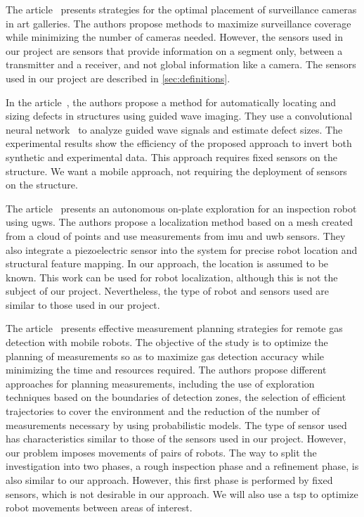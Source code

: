 The article~\cite{article455556} presents strategies for the optimal placement of surveillance cameras in art galleries.
The authors propose methods to maximize surveillance coverage while minimizing the number of cameras needed.
However, the sensors used in our project are sensors that provide information on a segment only, between a transmitter and a receiver, and not global information like a camera.
The sensors used in our project are described in \ref{sec:definitions}.

In the article~\cite{articlesvsdf}, the authors propose a method for automatically locating and sizing defects in structures using guided wave imaging.
They use a convolutional neural network~\cite{enwiki:1159408824} to analyze guided wave signals and estimate defect sizes.
The experimental results show the efficiency of the proposed approach to invert both synthetic and experimental data.
This approach requires fixed sensors on the structure.
We want a mobile approach, not requiring the deployment of sensors on the structure.

The article~\cite{9568841} presents an autonomous on-plate exploration for an inspection robot using \gls{ugw}s.
The authors propose a localization method based on a mesh created from a cloud of points and use measurements from \gls{imu} and \gls{uwb} sensors.
They also integrate a piezoelectric sensor into the system for precise robot location and structural feature mapping.
In our approach, the location is assumed to be known.
This work can be used for robot localization, although this is not the subject of our project.
Nevertheless, the type of robot and sensors used are similar to those used in our project.

The article~\cite{7487624} presents effective measurement planning strategies for remote gas detection with mobile robots.
The objective of the study is to optimize the planning of measurements so as to maximize gas detection accuracy while minimizing the time and resources required.
The authors propose different approaches for planning measurements, including the use of exploration techniques based on the boundaries of detection zones, the selection of efficient trajectories to cover the environment and the reduction of the number of measurements necessary by using probabilistic models.
The type of sensor used has characteristics similar to those of the sensors used in our project.
However, our problem imposes movements of pairs of robots.
The way to split the investigation into two phases, a rough inspection phase and a refinement phase, is also similar to our approach.
However, this first phase is performed by fixed sensors, which is not desirable in our approach.
We will also use a \gls{tsp} to optimize robot movements between areas of interest.


